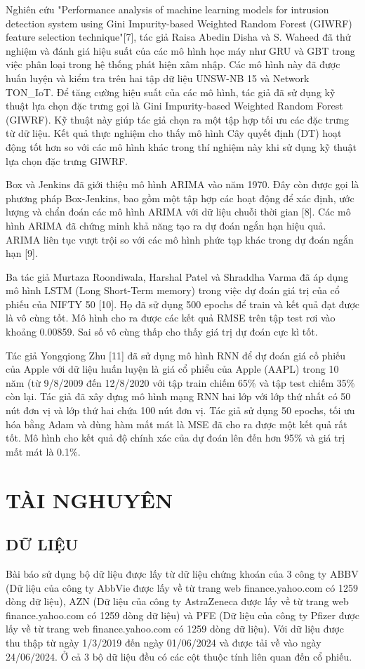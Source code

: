 \documentclass[conference]{IEEEtran}
\begin{document}
Nghiên cứu "Performance analysis of machine learning models for intrusion detection system using Gini Impurity-based Weighted Random Forest (GIWRF) feature selection technique"[7], tác giả Raisa Abedin Disha và S. Waheed đã thử nghiệm và đánh giá hiệu suất của các mô hình học máy như GRU và GBT trong việc phân loại trong hệ thống phát hiện xâm nhập. Các mô hình này đã được huấn luyện và kiểm tra trên hai tập dữ liệu UNSW-NB 15 và Network TON\_IoT. Để tăng cường hiệu suất của các mô hình, tác giả đã sử dụng kỹ thuật lựa chọn đặc trưng gọi là Gini Impurity-based Weighted Random Forest (GIWRF). Kỹ thuật này giúp tác giả chọn ra một tập hợp tối ưu các đặc trưng từ dữ liệu. Kết quả thực nghiệm cho thấy mô hình Cây quyết định (DT) hoạt động tốt hơn so với các mô hình khác trong thí nghiệm này khi sử dụng kỹ thuật lựa chọn đặc trưng GIWRF.

Box và Jenkins đã giới thiệu mô hình ARIMA vào năm 1970. Đây còn được gọi là phương pháp Box-Jenkins, bao gồm một tập hợp các hoạt động để xác định, ước lượng và chẩn đoán các mô hình ARIMA với dữ liệu chuỗi thời gian [8]. Các mô hình ARIMA đã chứng minh khả năng tạo ra dự đoán ngắn hạn hiệu quả. ARIMA liên tục vượt trội so với các mô hình phức tạp khác trong dự đoán ngắn hạn [9].

Ba tác giả Murtaza Roondiwala, Harshal Patel và Shraddha Varma đã áp dụng mô hình LSTM (Long Short-Term memory) trong việc dự đoán giá trị của cổ phiếu của NIFTY 50 [10]. Họ đã sử dụng 500 epochs để train và kết quả đạt được là vô cùng tốt. Mô hình cho ra được các kết quả RMSE trên tập test rơi vào khoảng 0.00859. Sai số vô cùng thấp cho thấy giá trị dự đoán cực kì tốt.

Tác giả Yongqiong Zhu [11] đã sử dụng mô hình RNN để dự đoán giá cố phiếu của Apple với dữ liệu huấn luyện là giá cổ phiểu của Apple (AAPL) trong 10 năm (từ 9/8/2009 đến 12/8/2020 với tập train chiếm 65\% và tập test chiếm 35\% còn lại. Tác giả đã xây dựng mô hình mạng RNN hai lớp với lớp thứ nhất có 50 nút đơn vị và lớp thứ hai chứa 100 nút đơn vị. Tác giả sử dụng 50 epochs, tối ưu hóa bằng Adam và dùng hàm mất mát là MSE đã cho ra được một kết quả rất tốt. Mô hình cho kết quả độ chính xác của dự đoán lên đến hơn 95\% và giá trị mất mát là 0.1\%.

\section{TÀI NGHUYÊN}
\subsection{DỮ LIỆU}
Bài báo sử dụng bộ dữ liệu được lấy từ dữ liệu chứng khoán của 3 công ty ABBV 
(Dữ liệu của công ty AbbVie được lấy về từ trang web finance.yahoo.com có 1259 dòng dữ liệu), AZN 
(Dữ liệu của công ty AstraZeneca được lấy về từ trang web finance.yahoo.com có 1259 dòng dữ liệu) 
và PFE (Dữ liệu của công ty Pfizer được lấy về từ trang web finance.yahoo.com có 1259 dòng dữ liệu). 
Với dữ liệu được thu thập từ ngày 1/3/2019 đến ngày 01/06/2024 và được tải về vào ngày 24/06/2024. 
Ở cả 3 bộ dữ liệu đều có các cột thuộc tính liên quan đến cổ phiếu.
\end{document}
